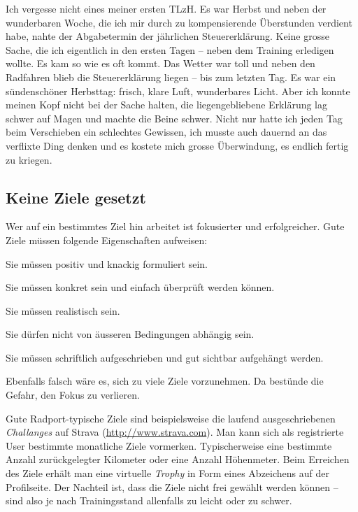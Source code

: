 \documentclass[a4paper,DIV13,BCOR0cm]{scrartcl}
\newcommand{\tlzh}{TLzH}
\begin{document}
Ich vergesse nicht eines meiner ersten \tlzh{}. Es war Herbst und neben der wunderbaren Woche,
die ich mir durch zu kompensierende Überstunden verdient habe, nahte der Abgabetermin der jährlichen Steuererklärung.
Keine grosse Sache, die ich eigentlich in den ersten Tagen -- neben dem Training erledigen wollte.
Es kam so wie es oft kommt. Das Wetter war toll und neben den Radfahren blieb die Steuererklärung liegen -- bis zum letzten Tag.
Es war ein sündenschöner Herbsttag: frisch, klare Luft, wunderbares Licht.
Aber ich konnte meinen Kopf nicht bei der Sache halten, die liegengebliebene Erklärung lag schwer auf Magen und machte die Beine schwer.
Nicht nur hatte ich jeden Tag beim Verschieben ein schlechtes Gewissen,
ich musste auch dauernd an das verflixte Ding denken und es kostete mich grosse Überwindung, es endlich fertig zu kriegen.

\subsection{Keine Ziele gesetzt}

Wer auf ein bestimmtes Ziel hin arbeitet ist fokusierter und erfolgreicher.
Gute Ziele müssen folgende Eigenschaften aufweisen:

\begin{itemize*}
  \item Sie müssen positiv und knackig formuliert sein.
  \item Sie müssen konkret sein und einfach überprüft werden können.
  \item Sie müssen realistisch sein.
  \item Sie dürfen nicht von äusseren Bedingungen abhängig sein.
  \item Sie müssen schriftlich aufgeschrieben und gut sichtbar aufgehängt werden.
\end{itemize*}

Ebenfalls falsch wäre es, sich zu viele Ziele vorzunehmen.
Da bestünde die Gefahr, den Fokus zu verlieren.

Gute Radport-typische Ziele sind beispielsweise die laufend ausgeschriebenen \textsl{Challanges} auf Strava (\url{http://www.strava.com}).
Man kann sich als registrierte User bestimmte monatliche Ziele vormerken.
Typischerweise eine bestimmte Anzahl zurückgelegter Kilometer oder eine Anzahl Höhenmeter.
Beim Erreichen des Ziele erhält man eine virtuelle \textsl{Trophy} in Form eines Abzeichens auf der Profilseite.
Der Nachteil ist, dass die Ziele nicht frei gewählt werden können -- sind also je nach Trainingsstand allenfalls zu leicht oder zu schwer.
\end{document}
